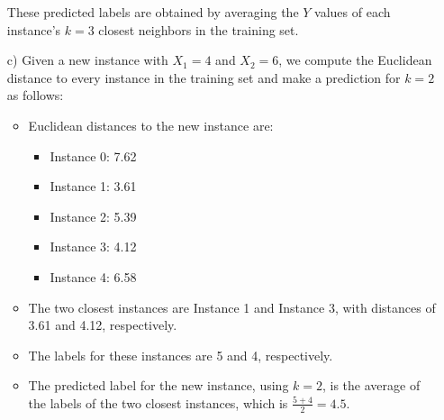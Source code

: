 \documentclass{article}
\begin{document}
\begin{itemize}
These predicted labels are obtained by averaging the \(Y\) values of each instance's \(k=3\) closest neighbors in the training set.

\item[c)]
    Given a new instance with \(X_1 = 4\) and \(X_2 = 6\), we compute the Euclidean distance to every instance in the training set and make a prediction for \(k = 2\) as follows:

\begin{itemize}
    \item Euclidean distances to the new instance are:
    \begin{itemize}
        \item Instance 0: 7.62
        \item Instance 1: 3.61
        \item Instance 2: 5.39
        \item Instance 3: 4.12
        \item Instance 4: 6.58
    \end{itemize}
    \item The two closest instances are Instance 1 and Instance 3, with distances of 3.61 and 4.12, respectively.
    \item The labels for these instances are 5 and 4, respectively.
    \item The predicted label for the new instance, using \(k=2\), is the average of the labels of the two closest instances, which is \(\frac{5 + 4}{2} = 4.5\).
\end{itemize}

    \end{itemize}
\end{document}
